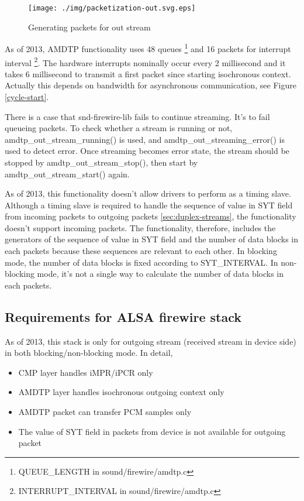 \documentclass[onecolumn]{article}
\begin{document}
\begin{figure}[H]
	\centering
	\texttt{[image: ./img/packetization-out.svg.eps]}
	\caption{{Generating packets for out stream}}
	\label{fig:packetization-out}
\end{figure}

As of 2013, AMDTP functionality uses 48 queues \footnote{QUEUE\_LENGTH in sound/firewire/amdtp.c} and 16 packets for interrupt interval \footnote{INTERRUPT\_INTERVAL in sound/firewire/amdtp.c}. The hardware interrupts nominally occur every 2 millisecond and it takes 6 millisecond to transmit a first packet since starting isochronous context. Actually this depends on bandwidth for asynchronous communication, see Figure \ref{cycle-start}.

There is a case that snd-firewire-lib fails to continue streaming. It's to fail queueing packets. To check whether a stream is running or not, amdtp\_out\_stream\_running() is used, and amdtp\_out\_streaming\_error() is used to detect error. Once streaming becomes error state, the stream should be stopped by amdtp\_out\_stream\_stop(), then start by amdtp\_out\_stream\_start() again.

As of 2013, this functionality doesn't allow drivers to perform as a timing slave. Although a timing slave is required to handle the sequence of value in SYT field from incoming packets to outgoing packets \ref{sec:duplex-streams}, the functionality doesn't support incoming packets. The functionality, therefore, includes the generators of the sequence of value in SYT field and the number of data blocks in each packets because these sequences are relevant to each other. In blocking mode, the number of data blocks is fixed according to SYT\_INTERVAL. In non-blocking mode, it's not a single way to calculate the number of data blocks in each packets\cite{iec61883-6-1, iec61883-6-2}.

\subsection{Requirements for ALSA firewire stack}

As of 2013, this stack is only for outgoing stream (received stream in device side) in both blocking/non-blocking mode. In detail,
\begin{itemize}
\item CMP layer handles iMPR/iPCR only
\item AMDTP layer handles isochronous outgoing context only
\item AMDTP packet can transfer PCM samples only
\item The value of SYT field in packets from device is not available for outgoing packet
\end{itemize}
\end{document}
